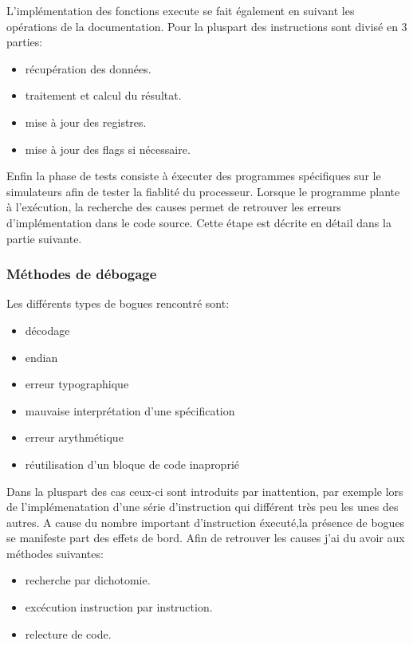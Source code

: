 L'implémentation des fonctions execute se fait également en suivant les opérations de la documentation. Pour la pluspart des instructions sont divisé en 3 parties:
\begin{itemize}
\item récupération des données.
\item traitement et calcul du résultat.
\item mise à jour des registres.
\item mise à jour des flags si nécessaire.
\end{itemize}
 

Enfin la phase de tests consiste à éxecuter des programmes spécifiques sur le simulateurs afin de tester la fiablité du processeur. 
Lorsque le programme plante à l'exécution, la recherche des causes permet de retrouver les erreurs d'implémentation dans le code source.
Cette étape est décrite en détail dans la partie suivante.

\subsubsection{Méthodes de débogage}

Les différents types de bogues rencontré sont:
\begin{itemize}
\item décodage
\item endian
\item erreur typographique
\item mauvaise interprétation d'une spécification
\item erreur arythmétique
\item réutilisation d'un bloque de code inaproprié
\end{itemize}

Dans la pluspart des cas ceux-ci sont introduits par inattention, par exemple lors de l'implémenatation d'une série d'instruction qui différent très peu les unes 
des autres. A cause du nombre important d'instruction éxecuté,la présence de bogues se manifeste part des effets de bord. Afin de retrouver les causes j'ai du avoir aux méthodes suivantes:

\begin{itemize}
\item recherche par dichotomie.
\item excécution instruction par instruction. 
\item relecture de code.
\end{itemize}

